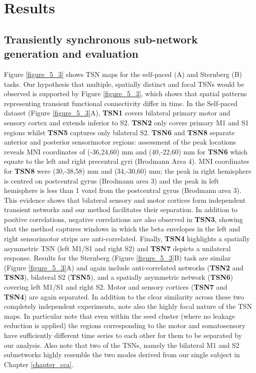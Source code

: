 \section{Results}\label{sec_kmeans_results}
\subsection{Transiently synchronous sub-network generation and evaluation}

Figure \ref{figure_5_3} shows TSN maps for the self-paced (A) and Sternberg (B) tasks. Our hypothesis that multiple, spatially distinct and focal TSNs would be observed is supported by Figure \ref{figure_5_3}, which shows that spatial patterns representing transient functional connectivity differ in time. In the Self-paced dataset (Figure \ref{figure_5_3}A), \textbf{TSN1} covers bilateral primary motor and sensory cortex and extends inferior to S2. \textbf{TSN2} only covers primary M1 and S1 regions whilst \textbf{TSN5} captures only bilateral S2. \textbf{TSN6} and \textbf{TSN8} separate anterior and posterior sensorimotor regions: assessment of the peak locations reveals MNI coordinates of (-36,24,60) mm and (40,-22,60) mm for \textbf{TSN6} which equate to the left and right precentral gyri (Brodmann Area 4). MNI coordinates for \textbf{TSN8} were (30,-38,58) mm and (34,-30,60) mm; the peak in right hemisphere is centred on postcentral gyrus (Brodmann area 3) and the peak in left hemisphere is less than 1 voxel from the postcentral gyrus (Brodmann area 3). This evidence shows that bilateral sensory and motor cortices form independent transient networks and our method facilitates their separation. In addition to positive correlations, negative correlations are also observed in \textbf{TSN3}, showing that the method captures windows in which the beta envelopes in the left and right sensorimotor strips are anti-correlated. Finally, \textbf{TSN4} highlights a spatially asymmetric TSN (left M1/S1 and right S2) and \textbf{TSN7} depicts a unilateral response. Results for the Sternberg (Figure \ref{figure_5_3}B) task are similar (Figure \ref{figure_5_3}A) and again include anti-correlated networks (\textbf{TSN2} and \textbf{TSN3}), bilateral S2 (\textbf{TSN5}), and a spatially asymmetric network (\textbf{TSN6}) covering left M1/S1 and right S2. Motor and sensory cortices (\textbf{TSN7} and \textbf{TSN4}) are again separated. In addition to the clear similarity across these two completely independent experiments, note also the highly focal nature of the TSN maps. In particular note that even within the seed cluster (where no leakage reduction is applied) the regions corresponding to the motor and somatosensory have sufficiently different time series to each other for them to be separated by our analysis. Also note that two of the TSNs, namely the bilateral M1 and S2 subnetworks highly resemble the two modes derived from our single subject in Chapter \ref{chapter_cca}.

